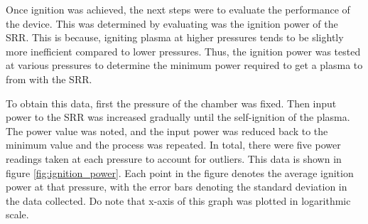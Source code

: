 %
%
%

Once ignition was achieved, the next steps were to evaluate the performance of the device. This was determined by evaluating was the ignition power of the SRR. This is because, igniting plasma at higher pressures tends to be slightly more inefficient compared to lower pressures. Thus, the ignition power was tested at various pressures to determine the minimum power required to get a plasma to from with the SRR. 

To obtain this data, first the pressure of the chamber was fixed. Then input power to the SRR was increased gradually until the self-ignition of the plasma. The power value was noted, and the input power was reduced back to the minimum value and the process was repeated. In total, there were five power readings taken at each pressure to account for outliers. This data is shown in figure \ref{fig:ignition_power}. Each point in the figure denotes the average ignition power at that pressure, with the error bars denoting the standard deviation in the data collected. Do note that x-axis of this graph was plotted in logarithmic scale. 

